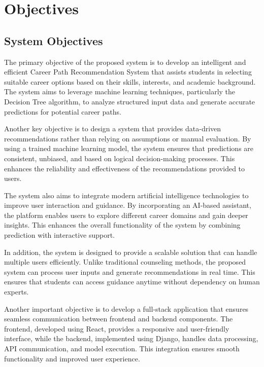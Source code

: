 \documentclass[12pt,a4paper]{report}
\begin{document}
{\chapter{Objectives}
\setlength{\parindent}{0pt}
\setlength{\parskip}{0.6em}
\justifying

\section{System Objectives}

The primary objective of the proposed system is to develop an intelligent and efficient Career Path Recommendation System that assists students in selecting suitable career options based on their skills, interests, and academic background. The system aims to leverage machine learning techniques, particularly the Decision Tree algorithm, to analyze structured input data and generate accurate predictions for potential career paths.

Another key objective is to design a system that provides data-driven recommendations rather than relying on assumptions or manual evaluation. By using a trained machine learning model, the system ensures that predictions are consistent, unbiased, and based on logical decision-making processes. This enhances the reliability and effectiveness of the recommendations provided to users.

The system also aims to integrate modern artificial intelligence technologies to improve user interaction and guidance. By incorporating an AI-based assistant, the platform enables users to explore different career domains and gain deeper insights. This enhances the overall functionality of the system by combining prediction with interactive support.

In addition, the system is designed to provide a scalable solution that can handle multiple users efficiently. Unlike traditional counseling methods, the proposed system can process user inputs and generate recommendations in real time. This ensures that students can access guidance anytime without dependency on human experts.

Another important objective is to develop a full-stack application that ensures seamless communication between frontend and backend components. The frontend, developed using React, provides a responsive and user-friendly interface, while the backend, implemented using Django, handles data processing, API communication, and model execution. This integration ensures smooth functionality and improved user experience.

}
\end{document}
